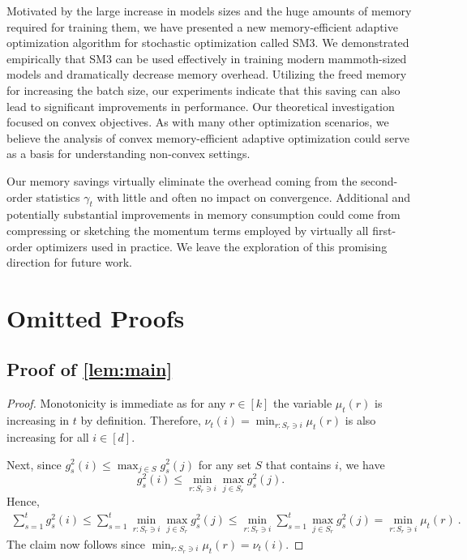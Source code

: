 \documentclass[a4paper,11pt]{article}
\def\NAME{SM3\xspace}
\newcommand{\mx}[1]{\mu_{#1}}
\newcommand{\mi}[1]{\nu_{#1}}
\begin{document}
Motivated by the large increase in models sizes and the huge amounts of memory
required for training them, we have presented a new memory-efficient adaptive
optimization algorithm for stochastic optimization called \NAME.  We
demonstrated empirically that \NAME can be used effectively in training modern
mammoth-sized models and dramatically decrease memory overhead. Utilizing the
freed memory for increasing the batch size, our experiments indicate that this
saving can also lead to significant improvements in performance.
Our theoretical investigation focused on convex objectives. As with many other
optimization scenarios, we believe the analysis of convex memory-efficient
adaptive optimization could serve as a basis for understanding non-convex
settings.

Our memory savings virtually eliminate the overhead coming
from the second-order statistics $\gamma_t$ with little and often no impact on
convergence. Additional and potentially substantial improvements in memory
consumption could come from compressing or sketching the momentum terms
employed by virtually all first-order optimizers used in practice. We leave the
exploration of this promising direction for future work.








\clearpage
\appendix




\section{Omitted Proofs}
\label{sec:moreproofs}

\subsection{Proof of \cref{lem:main}}

\begin{proof}
Monotonicity is immediate as for any $r \in [k]$ the variable
$\mx{t}(r)$ is increasing in $t$ by definition. Therefore,
$
  \mi{t}(i)
  =
  \min_{r : S_r \ni i} \mx{t}(r)
$
is also increasing for all $i \in [d]$.

Next, since $g_{s}^2(i) \leq \max_{j \in S} g_{s}^2(j)$ for any
set $S$ that contains $i$, we have
$$
  g_{s}^2(i)
  \leq
  \min_{r : S_r \ni i} \max_{j \in S_r} g_{s}^2(j)
  .
$$
Hence,
\begin{align*}
  \sum_{s=1}^t g_{s}^2(i)
  \leq
  \sum_{s=1}^t \min_{r : S_r \ni i} \max_{j \in S_r} g_{s}^2(j)
  \leq
  \min_{r : S_r \ni i} \sum_{s=1}^t \max_{j \in S_r} g_{s}^2(j)
  =
  \min_{r : S_r \ni i} \mx{t}(r)
  ~.
\end{align*}
The claim now follows since $\min_{r : S_r \ni i} \mx{t}(r) = \mi{t}(i)$.
\end{proof}
\end{document}
